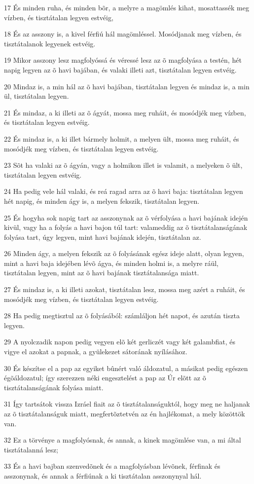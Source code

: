 \par 17 És minden ruha, és minden bõr, a melyre a magömlés kihat, mosattassék meg vízben, és tisztátalan legyen estvéig,
\par 18 És az asszony is, a kivel férfiú hál magömléssel. Mosódjanak meg vízben, és tisztátalanok legyenek estvéig.
\par 19 Mikor asszony lesz magfolyóssá és véressé lesz az õ magfolyása a testén, hét napig legyen az õ havi bajában, és valaki illeti azt, tisztátalan legyen estvéig.
\par 20 Mindaz is, a min hál az õ havi bajában, tisztátalan legyen és mindaz is, a min ül, tisztátalan legyen.
\par 21 És mindaz, a ki illeti az õ ágyát, mossa meg ruháit, és mosódjék meg vízben, és tisztátalan legyen estvéig.
\par 22 És mindaz is, a ki illet bármely holmit, a melyen ült, mossa meg ruháit, és mosódjék meg vízben, és tisztátalan legyen estvéig.
\par 23 Sõt ha valaki az õ ágyán, vagy a holmikon illet is valamit, a melyeken õ ült, tisztátalan legyen estvéig.
\par 24 Ha pedig vele hál valaki, és reá ragad arra az õ havi baja: tisztátalan legyen hét napig, és minden ágy is, a melyen fekszik, tisztátalan legyen.
\par 25 És hogyha sok napig tart az asszonynak az õ vérfolyása a havi bajának idején kivül, vagy ha a folyás a havi bajon túl tart: valameddig az õ tisztátalanságának folyása tart, úgy legyen, mint havi bajának idején, tisztátalan az.
\par 26 Minden ágy, a melyen fekszik az õ folyásának egész ideje alatt, olyan legyen, mint a havi baja idejében lévõ ágya, és minden holmi is, a melyre ráül, tisztátalan legyen, mint az õ havi bajának tisztátalansága miatt.
\par 27 És mindaz is, a ki illeti azokat, tisztátalan lesz, mossa meg azért a ruháit, és mosódjék meg vízben, és tisztátalan legyen estvéig.
\par 28 Ha pedig megtisztul az õ folyásából: számláljon hét napot, és azután tiszta legyen.
\par 29 A nyolczadik napon pedig vegyen elõ két gerliczét vagy két galambfiat, és vigye el azokat a papnak, a gyülekezet sátorának nyílásához.
\par 30 És készítse el a pap az egyiket bûnért való áldozatul, a másikat pedig egészen égõáldozatul; így szerezzen néki engesztelést a pap az Úr elõtt az õ tisztátalanságának folyása miatt.
\par 31 Így tartsátok vissza Izráel fiait az õ tisztátalanságuktól, hogy meg ne haljanak az õ tisztátalanságuk miatt, megfertõztetvén az én hajlékomat, a mely közöttök van.
\par 32 Ez a törvénye a magfolyósnak, és annak, a kinek magömlése van, a mi által tisztátalanná lesz;
\par 33 És a havi bajban szenvedõnek és a magfolyásban lévõnek, férfinak és asszonynak, és annak a férfiúnak a ki tisztátalan asszonynyal hál.

